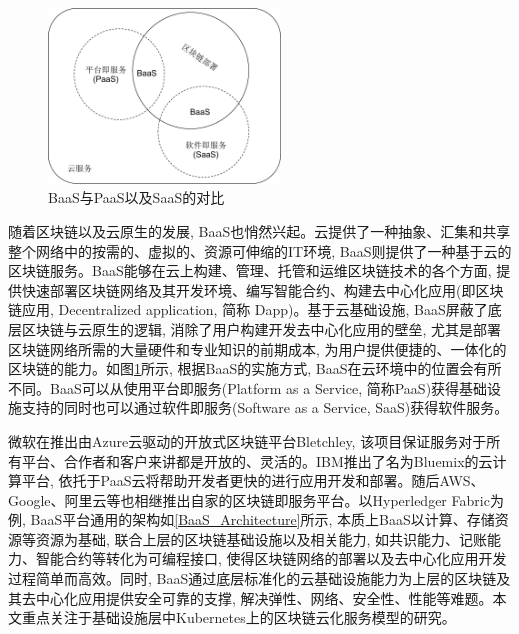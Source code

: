 \begin{figure}[h] %
    \centering %
    \includegraphics[width=0.55\textwidth]{FIGs/chapter2/BaaS_PaaS_SaaS.pdf} %
    \caption{BaaS与PaaS以及SaaS的对比} %
    \label{BaaS_PaaS_SaaS} %
\end{figure}%

随着区块链以及云原生的发展, BaaS也悄然兴起。云提供了一种抽象、汇集和共享整个网络中的按需的、虚拟的、资源可伸缩的IT环境, BaaS则提供了一种基于云的区块链服务。BaaS能够在云上构建、管理、托管和运维区块链技术的各个方面, 提供快速部署区块链网络及其开发环境、编写智能合约、构建去中心化应用(即区块链应用, Decentralized application, 简称 Dapp)。基于云基础设施, BaaS屏蔽了底层区块链与云原生的逻辑, 消除了用户构建开发去中心化应用的壁垒, 尤其是部署区块链网络所需的大量硬件和专业知识的前期成本, 为用户提供便捷的、一体化的区块链的能力。如图\ref{BaaS_PaaS_SaaS}所示, 根据BaaS的实施方式, BaaS在云环境中的位置会有所不同\cite{onik2019performance}。BaaS可以从使用平台即服务(Platform as a Service, 简称PaaS)获得基础设施支持的同时也可以通过软件即服务(Software as a Service, SaaS)获得软件服务。

微软在推出由Azure云驱动的开放式区块链平台Bletchley, 该项目保证服务对于所有平台、合作者和客户来讲都是开放的、灵活的\cite{BlockchainasaServiceNextGenerationofCloudServices}。IBM推出了名为Bluemix的云计算平台, 依托于PaaS云将帮助开发者更快的进行应用开发和部署。随后AWS、Google、阿里云等也相继推出自家的区块链即服务平台。以Hyperledger Fabric为例, BaaS平台通用的架构如\ref{BaaS_Architecture}所示, 本质上BaaS以计算、存储资源等资源为基础, 联合上层的区块链基础设施以及相关能力, 如共识能力、记账能力、智能合约等转化为可编程接口, 使得区块链网络的部署以及去中心化应用开发过程简单而高效。同时, BaaS通过底层标准化的云基础设施能力为上层的区块链及其去中心化应用提供安全可靠的支撑, 解决弹性、网络、安全性、性能等难题。本文重点关注于基础设施层中Kubernetes上的区块链云化服务模型的研究。

